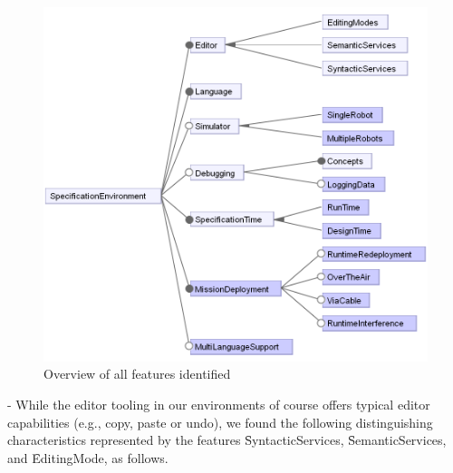 \begin{figure}[t]
     \centering
    \includegraphics[width=\columnwidth]{fig/toplevelfeatures.png}
			\vspace{-.3cm}
      \caption{Overview of all features identified%
      }
      \label{fig:featuremodel}
			\vspace{-.4cm}
\end{figure}

\newcommand{\fsyntacticservices}{\f{SyntacticServices}}
\newcommand{\fsemanticservices}{\f{SemanticServices}}
\newcommand{\feditingmode}{\f{EditingMode}}

\parhead{\feditor} - While the editor tooling in our environments of course offers typical editor capabilities (e.g., copy, paste or undo), we found the following distinguishing characteristics represented by the features \fsyntacticservices, \fsemanticservices, and \feditingmode, as follows.

